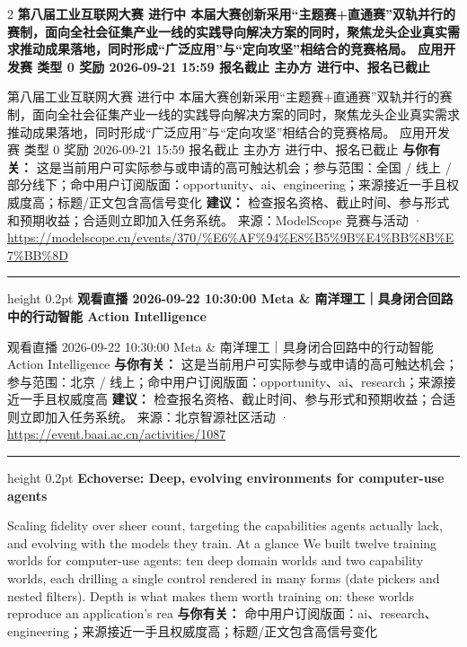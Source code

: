 \documentclass[10.5pt]{ctexart}
\begin{document}
\begin{multicols}{2}
{\large\bfseries 第八届工业互联网大赛 进行中 本届大赛创新采用“主题赛+直通赛”双轨并行的赛制，面向全社会征集产业一线的实践导向解决方案的同时，聚焦龙头企业真实需求推动成果落地，同时形成“广泛应用”与“定向攻坚”相结合的竞赛格局。 应用开发赛 类型 0 奖励 2026-09-21 15:59 报名截止 主办方 进行中、报名已截止}\par
第八届工业互联网大赛 进行中 本届大赛创新采用“主题赛+直通赛”双轨并行的赛制，面向全社会征集产业一线的实践导向解决方案的同时，聚焦龙头企业真实需求推动成果落地，同时形成“广泛应用”与“定向攻坚”相结合的竞赛格局。 应用开发赛 类型 0 奖励 2026-09-21 15:59 报名截止 主办方 进行中、报名已截止
\textbf{与你有关：} 这是当前用户可实际参与或申请的高可触达机会；参与范围：全国 / 线上 / 部分线下；命中用户订阅版面：opportunity、ai、engineering；来源接近一手且权威度高；标题/正文包含高信号变化
\textbf{建议：} 检查报名资格、截止时间、参与形式和预期收益；合适则立即加入任务系统。
{\footnotesize\color{ormuted} 来源：ModelScope 竞赛与活动 · \url{https://modelscope.cn/events/370/%E6%AF%94%E8%B5%9B%E4%BB%8B%E7%BB%8D}}
\vspace{2mm}
\hrule height 0.2pt
\vspace{2mm}
{\large\bfseries 观看直播 2026-09-22 10:30:00 Meta \& 南洋理工｜具身闭合回路中的行动智能 Action Intelligence}\par
观看直播 2026-09-22 10:30:00 Meta \& 南洋理工｜具身闭合回路中的行动智能 Action Intelligence
\textbf{与你有关：} 这是当前用户可实际参与或申请的高可触达机会；参与范围：北京 / 线上；命中用户订阅版面：opportunity、ai、research；来源接近一手且权威度高
\textbf{建议：} 检查报名资格、截止时间、参与形式和预期收益；合适则立即加入任务系统。
{\footnotesize\color{ormuted} 来源：北京智源社区活动 · \url{https://event.baai.ac.cn/activities/1087}}
\vspace{2mm}
\hrule height 0.2pt
\vspace{2mm}
{\large\bfseries Echoverse: Deep, evolving environments for computer-use agents}\par
Scaling fidelity over sheer count, targeting the capabilities agents actually lack, and evolving with the models they train. At a glance We built twelve training worlds for computer-use agents: ten deep domain worlds and two capability worlds, each drilling a single control rendered in many forms (date pickers and nested filters). Depth is what makes them worth training on: these worlds reproduce an application’s rea
\textbf{与你有关：} 命中用户订阅版面：ai、research、engineering；来源接近一手且权威度高；标题/正文包含高信号变化

\end{multicols}
\end{document}
